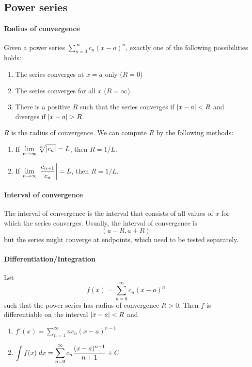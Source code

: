 \documentclass[a4paper]{article}
\begin{document}
\begin{multicols*}{3}
    \subsection*{Power series}
      \paragraph{Radius of convergence}
        Given a power series $\sum_{n=0}^\infty c_n (x-a)^n$, exactly one of the following possibilities holds:
        \begin{enumerate}[label=(\alph*)]
          \item The series converges at $x=a$ only ($R=0$)
          \item The series converges for all $x$ ($R=\infty$)
          \item There is a positive $R$ such that the series converges if $\left\lvert x-a\right\rvert < R$ and diverges if $\left\lvert x-a\right\rvert > R$.
        \end{enumerate}
        $R$ is the radius of convergence. We can compute $R$ by the following methods:
        \begin{enumerate}[label=(\roman*)]
          \item If $\displaystyle \lim_{n \rightarrow \infty} \sqrt[n]{\left\lvert c_n\right\rvert} = L$, then $R = 1/L$.
          \item If $\displaystyle \lim_{n \rightarrow \infty} \left\lvert\dfrac{c_{n+1}}{c_n}\right\rvert = L$, then $R = 1/L$.
        \end{enumerate}
      \paragraph{Interval of convergence}
        The interval of convergence is the interval that consists of all values of $x$ for which the series converges. Usually, the interval of convergence is
        \begin{equation*}
          (a-R, a+R)
        \end{equation*}
        but the series might converge at endpoints, which need to be tested separately.
      \paragraph{Differentiation/Integration}
        Let
        \begin{equation*}
          f(x) = \sum_{n=0}^\infty c_n (x-a)^n
        \end{equation*}
        such that the power series has radius of convergence $R > 0$. Then $f$ is differentiable on the interval $\left\lvert x-a\right\rvert < R$ and
        \begin{enumerate}[label=(\roman*)]
          \item $\displaystyle f'(x) = \sum_{n=1}^\infty n c_n (x-a)^{n-1}$
          \item $\displaystyle \int f(x) \; dx = \sum_{n=0}^\infty c_n \dfrac{(x-a)^{n+1}}{n+1} + C$
        \end{enumerate}

\end{multicols*}
\end{document}
